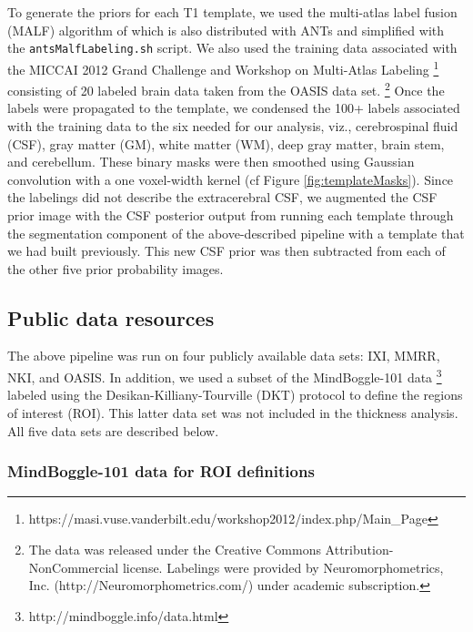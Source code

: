To generate the priors for each T1 template, we used the multi-atlas label fusion (MALF) 
algorithm of \cite{wang2013} which is also distributed with ANTs and simplified with the 
{\tt antsMalfLabeling.sh} script.  We also used the training data associated with the 
MICCAI 2012 Grand Challenge and Workshop on Multi-Atlas Labeling%
\footnote{
https://masi.vuse.vanderbilt.edu/workshop2012/index.php/Main\_Page
}
consisting of 20 labeled brain data taken from the OASIS data set.%
\footnote{
The data was released under the Creative Commons Attribution-NonCommercial license. 
Labelings were provided by Neuromorphometrics, Inc. (http://Neuromorphometrics.com/) 
under academic subscription.
}
Once the labels were propagated to the template, we condensed the 100+ labels associated
with the training data to the six needed for our analysis, viz., cerebrospinal fluid (CSF), 
gray matter (GM), white matter (WM), deep gray matter, brain stem, and cerebellum.  These binary
masks were then smoothed using Gaussian convolution with a one voxel-width kernel (cf
Figure \ref{fig:templateMasks}).  Since the labelings did not describe the extracerebral
CSF, we augmented the CSF prior image with the CSF posterior output from running each template 
through the segmentation component of the above-described pipeline with a template 
that we had built previously.  This new CSF prior was then subtracted from each of the
other five prior probability images.

\subsection{Public data resources}

The above pipeline was run on four publicly available data sets:
IXI, MMRR, NKI, and OASIS. 
In addition, we used a subset of the MindBoggle-101 data%
\footnote{
http://mindboggle.info/data.html
} 
labeled using the 
Desikan-Killiany-Tourville (DKT) protocol \citep{klein2012} to define the
regions of interest (ROI).  This latter data set was not included in the 
thickness analysis.
All five data sets are described below.

\subsubsection{MindBoggle-101 data for ROI definitions}

